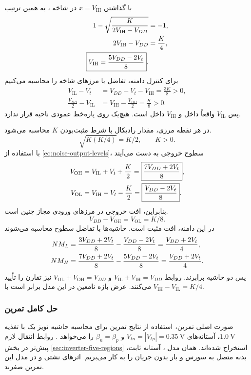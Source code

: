 با گذاشتن \(x=V_{\mathrm{IH}}\) در شاخه ، به همین ترتیب
\begin{align}
 1-\sqrt{\frac{K}{2V_{\mathrm{IH}}-V_{DD}}}&=-1,\notag\\
 2V_{\mathrm{IH}}-V_{DD}&=\frac{K}{4},\notag\\
 \boxed{V_{\mathrm{IH}}=\frac{5V_{DD}-2V_t}{8}}.
 \label{eq:noise-vih}
\end{align}
برای کنترل دامنه، تفاضل با مرزهای شاخه را محاسبه می‌کنیم
\begin{align*}
 V_{\mathrm{IL}}-V_t
 &=V_{DD}-V_t-V_{\mathrm{IH}}=\frac{3K}{8}>0,\\
 \frac{V_{DD}}{2}-V_{\mathrm{IL}}
 &=V_{\mathrm{IH}}-\frac{V_{DD}}{2}=\frac{K}{8}>0.
\end{align*}
پس \(V_{\mathrm{IL}}\) واقعاً داخل  و
\(V_{\mathrm{IH}}\) داخل  است. هیچ‌یک روی پاره‌خط
عمودی ناحیه  قرار ندارد.

در هر نقطه مرزی، مقدار رادیکال با شرط مثبت‌بودن \(K\) محاسبه می‌شود.
\[
 \sqrt{K(K/4)}=K/2,\qquad K>0.
\]
با استفاده از \eqref{eq:noise-output-levels}، سطوح خروجی به
دست می‌آیند
\begin{align}
 V_{\mathrm{OH}}&=V_{\mathrm{IL}}+V_t+\frac{K}{2}
 =\boxed{\frac{7V_{DD}+2V_t}{8}},\notag\\
 V_{\mathrm{OL}}&=V_{\mathrm{IH}}-V_t-\frac{K}{2}
 =\boxed{\frac{V_{DD}-2V_t}{8}}.
 \label{eq:noise-voh-vol}
\end{align}
بنابراین، افت خروجی در مرزهای ورودی مجاز چنین است.
\[
 V_{DD}-V_{\mathrm{OH}}=V_{\mathrm{OL}}=K/8.
\]
در این دامنه، افت مثبت است.
حاشیه‌ها با تفاضل سطوح محاسبه می‌شوند
\begin{align}
 NM_L&=\frac{3V_{DD}+2V_t}{8}-\frac{V_{DD}-2V_t}{8}
 =\frac{V_{DD}+2V_t}{4},\notag\\
 NM_H&=\frac{7V_{DD}+2V_t}{8}-\frac{5V_{DD}-2V_t}{8}
 =\frac{V_{DD}+2V_t}{4}.
 \label{eq:noise-symmetric-margins}
\end{align}
پس دو حاشیه برابرند. روابط
\(V_{\mathrm{IL}}+V_{\mathrm{IH}}=V_{DD}\) و
\(V_{\mathrm{OL}}+V_{\mathrm{OH}}=V_{DD}\) نیز تقارن را
تأیید می‌کنند. عرض بازه نامعین در این مدل برابر است با
\(V_{\mathrm{IH}}-V_{\mathrm{IL}}=K/4\).

\subsubsection{حل کامل تمرین }
\label{sec:noise-ex17}
صورت اصلی تمرین، استفاده از نتایج تمرین  برای محاسبه
حاشیه نویز یک  با تغذیه
\(\qty{1.0}{\volt}\)، آستانه‌های
\(V_{tn}=|V_{tp}|=\qty{0.35}{\volt}\) و
\(\beta_n=\beta_p\) را می‌خواهد
\cite[تمرین ، صفحه چاپی ۹۷]{weste}.
روابط انتقال لازم پیش‌تر در بخش
\ref{sec:inverter-five-regions} استخراج شده‌اند.
همان مدل ، آستانه ثابت، بدنه متصل به سورس و
بار بدون جریان  را به کار می‌بریم. اثرهای نشتی و
 در مدل این تمرین صفرند.

